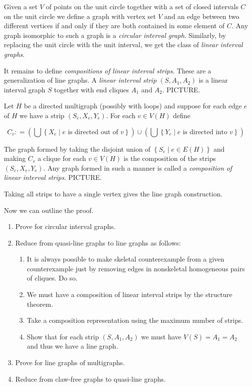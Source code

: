\documentclass[12pt]{article}
\theoremstyle{plain}
\theoremstyle{definition}
\theoremstyle{remark}
\newcommand{\setbs}[2]{\left\{ #1 \mid #2 \right\}}
\newcommand{\parens}[1]{\left( #1 \right)}
\newcommand{\DefinedAs}{\mathrel{\mathop:}=}
\begin{document}
\bigskip

Given a set $V$ of points on the unit circle together with a set of closed intervals $C$ on the unit circle we define a graph with vertex set $V$ and an edge between two different vertices if and only if they are both contained in some element of $C$.  Any graph isomorphic to such a graph is a \emph{circular interval graph}.  Similarly, by replacing the unit circle with the unit interval, we get the class of \emph{linear interval graphs}.

\bigskip

It remains to define \emph{compositions of linear interval strips}.  These are a generalization of line graphs. 
A \emph{linear interval strip} $(S, A_1, A_2)$ is a linear interval graph $S$ together with end cliques $A_1$ and $A_2$.  PICTURE.

\bigskip

Let $H$ be a directed multigraph (possibly with loops)
and suppose for each edge $e$ of $H$ we have a strip $(S_e, X_e, Y_e)$.  For
each $v \in V(H)$ define

\[C_v \DefinedAs \parens{\bigcup \setbs{X_e}{\text{$e$ is directed out of $v$}}}
\cup \parens{\bigcup \setbs{Y_e}{\text{$e$ is directed into $v$}}}\]

The graph formed by taking the disjoint union of $\setbs{S_e}{e \in E(H)}$ and
making $C_v$ a clique for each $v \in V(H)$ is the composition of the strips
$(S_e, X_e, Y_e)$.  Any graph formed in such a manner is called a
\emph{composition of linear interval strips}.  PICTURE.

Taking all strips to have a single vertex gives the line graph construction.

\bigskip\bigskip

Now we can outline the proof.

\begin{enumerate}
\item Prove for circular interval graphs.
\item Reduce from quasi-line graphs to line graphs as follows:
	\begin{enumerate}
	\item It is always possible to make skeletal counterexample from a given counterexample just by removing edges in nonskeletal homogeneous pairs of cliques.  Do so.
	\item We must have a composition of linear interval strips by the structure theorem.
	\item Take a composition representation using the maximum number of strips.
	\item Show that for each strip $(S, A_1, A_2)$ we must have $V(S) = A_1 = A_2$ and thus we have a line graph.
	\end{enumerate}
\item Prove for line graphs of multigraphs.
\item Reduce from claw-free graphs to quasi-line graphs.
\end{enumerate}
\end{document}

